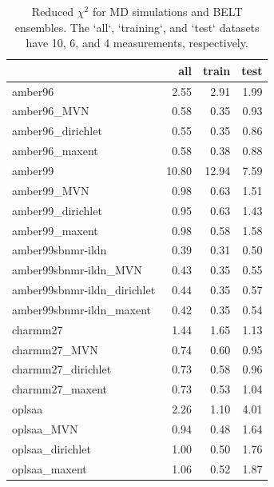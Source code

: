 \documentclass[12pt]{article}
\begin{document}
\begin{table}

\begin{tabular}{lrrr}
\toprule
{} &   all &  train &  test \\
\midrule
amber96                     &  2.55 &   2.91 &  1.99 \\
amber96\_MVN                 &  0.58 &   0.35 &  0.93 \\
amber96\_dirichlet           &  0.55 &   0.35 &  0.86 \\
amber96\_maxent              &  0.58 &   0.38 &  0.88 \\
\toprule
amber99                     & 10.80 &  12.94 &  7.59 \\
amber99\_MVN                 &  0.98 &   0.63 &  1.51 \\
amber99\_dirichlet           &  0.95 &   0.63 &  1.43 \\
amber99\_maxent              &  0.98 &   0.58 &  1.58 \\
\toprule
amber99sbnmr-ildn           &  0.39 &   0.31 &  0.50 \\
amber99sbnmr-ildn\_MVN       &  0.43 &   0.35 &  0.55 \\
amber99sbnmr-ildn\_dirichlet &  0.44 &   0.35 &  0.57 \\
amber99sbnmr-ildn\_maxent    &  0.42 &   0.35 &  0.54 \\
\toprule
charmm27                    &  1.44 &   1.65 &  1.13 \\
charmm27\_MVN                &  0.74 &   0.60 &  0.95 \\
charmm27\_dirichlet          &  0.73 &   0.58 &  0.96 \\
charmm27\_maxent             &  0.73 &   0.53 &  1.04 \\
\toprule
oplsaa                      &  2.26 &   1.10 &  4.01 \\
oplsaa\_MVN                  &  0.94 &   0.48 &  1.64 \\
oplsaa\_dirichlet            &  1.00 &   0.50 &  1.76 \\
oplsaa\_maxent               &  1.06 &   0.52 &  1.87 \\
\bottomrule
\end{tabular}

\caption{
Reduced $\chi^2$ for MD simulations and BELT ensembles.  The `all`, `training`, and `test` datasets have 10, 6, and 4 measurements, respectively.  
}
\end{table}


\newpage
\end{document}
